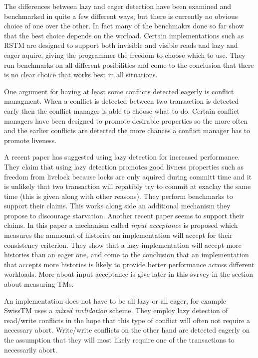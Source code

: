 The differences between lazy and eager detection have been examined and benchmarked in quite a few different ways, but there is currently no obvious choice of one over the other.
In fact many of the benchmakrs done so far show that the best choice depends on the worload.
Certain implementations such as RSTM \cite{Marathe06loweringthe} are designed to support both invisible and visible reads and lazy and eager aquire, giving the programmer the freedom to choose which to use.
They \cite{Marathe06loweringthe} run benchmarks on all different posibilities and come to the conclusion that there is no clear choice that works best in all situations.

One argument for having at least some conflicts detected eagerly is conflict managment.
When a conflict is detected between two transaction is detected early then the conflict manager is able to choose what to do.
Certain conflict managers have been designed to promote desirable properties so the more often and the earlier conflicts are detected the more chances a conflict manager has to promote liveness.

A recent paper \cite{1504199} has suggested using lazy detection for increased performance.
They claim that using lazy detection promotes good livness properties such as freedom from livelock because locks are only aquired during committ time and it is unlikely that two transaction will repatibly try to commit at exaclay the same time (this is given along with other reasons).
They perform benchmarks to support their claims.
This works along side an additional mechanism they propose to discourage starvation.
Another recent paper \cite{LPD-ARTICLE-2009-004} seems to support their claims.
In this paper a mechanism called \emph{input acceptance} is proposed which measures the ammount of histories an implementation will accept for their consistency criterion.
They show that a lazy implementation will accept more histories than an eager one, and come to the conclusion that an implementation that accepts more histories is likely to provide better performance across different workloads.
More about input acceptance is give later in this svrvey in the section about measuring TMs.

An implementation does not have to be all lazy or all eager, for example SwissTM \cite{1542494} uses a \emph{mixed invlidation} scheme.
They employ lazy detection of read/write conflicts in the hope that this type of conflict will often not require a necessary abort.
Write/write conflicts on the other hand are detected eagerly on the assumption that they will most likely require one of the transactions to necessarily abort.


